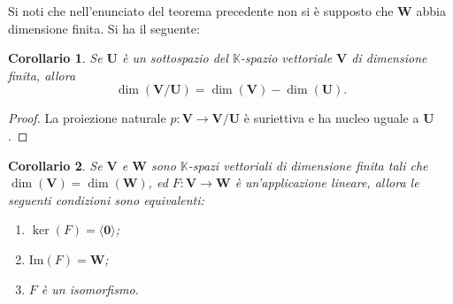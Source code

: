 \documentclass{article}
\theoremstyle{plain}
\newtheorem{cor}{Corollario}
\theoremstyle{definition}
\theoremstyle{remark}
\begin{document}
\vspace{10pt}

Si noti che nell'enunciato del teorema precedente non si è supposto che \( \mathbf{W} \) abbia dimensione finita.
Si ha il seguente:

\vspace{10pt}

\begin{bxthm}
\begin{cor}
Se \( \mathbf{U} \) è un sottospazio del \( \mathbb{K} \)-spazio vettoriale \( \mathbf{V} \) di dimensione finita, allora
\[
\dim(\mathbf{V}/\mathbf{U}) = \dim(\mathbf{V}) - \dim(\mathbf{U}).
\]    
\end{cor}
\end{bxthm}
\begin{proof}
La proiezione naturale \( p\colon \mathbf{V} \to \mathbf{V}/\mathbf{U} \) è suriettiva e ha nucleo uguale a \( \mathbf{U} \).
\end{proof}

\vspace{10pt}

\begin{bxthm}
\begin{cor}
Se $\mathbf{V}$ e $\mathbf{W}$ sono $\mathbb{K}$-spazi vettoriali di dimensione finita tali che $\dim(\mathbf{V}) = \dim(\mathbf{W})$, ed $F: \mathbf{V} \rightarrow \mathbf{W}$ è un'applicazione lineare, allora le seguenti condizioni sono equivalenti:
\begin{enumerate}
    \item $\ker(F) = \langle\mathbf{0}\rangle$;
    \item $\mathrm{Im}(F) = \mathbf{W}$;
    \item $F$ è un isomorfismo.
\end{enumerate}    
\end{cor}
\end{bxthm}

\vspace{10pt}
\end{document}
